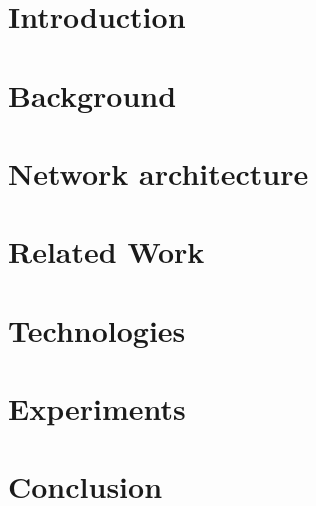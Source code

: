 \documentclass[english, a4paper, 11pt, twoside]{article}
\numberwithin{equation}{section} %
\begin{document}
\section{Introduction} %
\clearpage %

\section{Background}
    
\clearpage

\section{Network architecture}
    
\clearpage

\section{Related Work}
    
\clearpage

\section{Technologies}
    
\clearpage
  
\section{Experiments}
    
\clearpage

\section{Conclusion}
    
\clearpage

\newpage
\renewcommand\refname{References} %
{ %
}


%     
\end{document}
